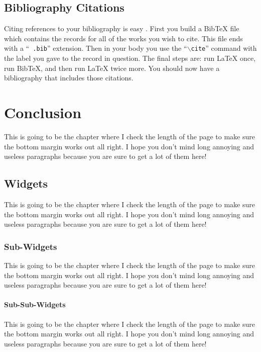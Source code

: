 \section{Bibliography Citations}
Citing references to your bibliography is easy \cite{belle}
\cite{kekb}. First you build a BibTeX file which contains the
records for all of the works you wish to cite. This file ends with a ``{\tt
.bib}'' extension. Then in your body you use the ``{\tt $\backslash$cite}''
command with the label you gave to the record in question. The final steps are: 
run LaTeX once, run BibTeX, and then run LaTeX twice more. You should now have
a bibliography that includes those citations.

\chapter{Conclusion}

This is going to be the chapter where I check the length of the page to make
sure the bottom margin works out all right.  I hope you don't mind long
annoying and useless paragraphs because you are sure to get a lot of them here!

\section{Widgets}

This is going to be the chapter where I check the length of the page
to make sure the bottom margin works out all right.  I hope you don't
mind long annoying and useless paragraphs because you are sure to get
a lot of them here!

\subsection{Sub-Widgets}

This is going to be the chapter where I check the length of the page
to make sure the bottom margin works out all right.  I hope you don't
mind long annoying and useless paragraphs because you are sure to get
a lot of them here!

\subsubsection{Sub-Sub-Widgets}

This is going to be the chapter where I check the length of the page
to make sure the bottom margin works out all right.  I hope you don't
mind long annoying and useless paragraphs because you are sure to get
a lot of them here!

